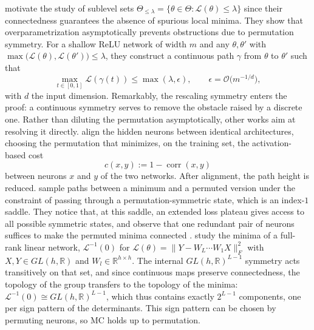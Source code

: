 \documentclass[mathematics,review,submit,moreauthors]{Definitions/mdpi}
\begin{document}
\citet{freeman2017} motivate the study of sublevel sets $\Theta_{\le\lambda}=\{\theta\in\Theta:\mathcal{L}(\theta)\le\lambda\}$ since their connectedness guarantees the absence of spurious local minima.
They show that overparametrization asymptotically prevents obstructions due to permutation symmetry.
For a shallow ReLU network of width $m$ and any $\theta,\theta'$ with $\max\big(\mathcal{L}(\theta),\mathcal{L}(\theta')\big)\le\lambda$, they construct a continuous path $\gamma$ from $\theta$ to $\theta'$ such that
\begin{equation*}
    \max_{t\in[0,1]}\mathcal{L}(\gamma(t))\le\max(\lambda,\epsilon),\qquad \epsilon=\mathcal{O}\big(m^{-1/d}\big),
\end{equation*}
with $d$ the input dimension.
Remarkably, the rescaling symmetry enters the proof: a continuous symmetry serves to remove the obstacle raised by a discrete one.
Rather than diluting the permutation asymptotically, other works aim at resolving it directly.
\citet{tatro2020} align the hidden neurons between identical architectures, choosing the permutation that minimizes, on the training set, the activation-based cost
\begin{equation*}
    c(x,y):=1-\operatorname{corr}(x,y)
\end{equation*}
between neurons $x$ and $y$ of the two networks.
After alignment, the path height is reduced.
\citet{brea2019} sample paths between a minimum and a permuted version under the constraint of passing through a permutation-symmetric state, which is an index-$1$ saddle.
They notice that, at this saddle, an extended loss plateau gives access to all possible symmetric states, and observe that one redundant pair of neurons suffices to make the permuted minima connected \citep{brea2019,simsek2021}.
\citet{zhao2025a} study the minima of a full-rank linear network, $\mathcal{L}^{-1}(0)$ for $\mathcal{L}(\theta)=\lVert Y-W_L\cdots W_1X\rVert_F^2$ with $X,Y\in GL(h,\mathbb{R})$ and $W_l\in\mathbb{R}^{h\times h}$.
The internal $GL(h,\mathbb{R})^{L-1}$ symmetry acts transitively on that set, and since continuous maps preserve connectedness, the topology of the group transfers to the topology of the minima: $\mathcal{L}^{-1}(0)\cong GL(h,\mathbb{R})^{L-1}$, which thus contains exactly $2^{L-1}$ components, one per sign pattern of the determinants.
This sign pattern can be chosen by permuting neurons, so MC holds up to permutation.
\end{document}
